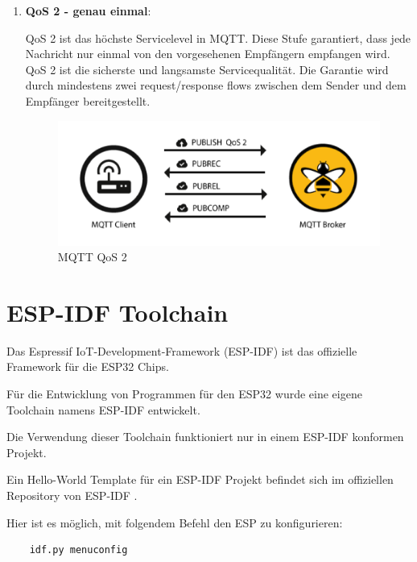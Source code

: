\begin{enumerate}
    \item \textbf{QoS 2 - genau einmal}:
    
    QoS 2 ist das höchste Servicelevel in MQTT. Diese Stufe garantiert, dass jede Nachricht nur einmal von den vorgesehenen Empfängern empfangen wird. QoS 2 ist die sicherste und langsamste Servicequalität. Die Garantie wird durch mindestens zwei request/response flows zwischen dem Sender und dem Empfänger bereitgestellt. 

    \begin{figure}[H]
        \begin{center}
            \includegraphics[scale=0.8]{images/QoS-2.png}
            \caption{MQTT QoS 2 \cite{hivemq}}
        \end{center}
    \end{figure}
\end{enumerate}

\section{ESP-IDF Toolchain}\label{sec:esp-idf-toolchain}

Das Espressif IoT-Development-Framework (ESP-IDF) ist das offizielle Framework für die ESP32 Chips. \cite{esp-idf-github}

Für die Entwicklung von Programmen für den ESP32 wurde eine eigene Toolchain namens ESP-IDF entwickelt.

Die Verwendung dieser Toolchain funktioniert nur in einem ESP-IDF konformen Projekt.

Ein Hello-World Template für ein ESP-IDF Projekt befindet sich im offiziellen Repository von ESP-IDF \cite{esp-idf-github-template}.

Hier ist es möglich, mit folgendem Befehl den ESP zu konfigurieren:

\begin{verbatim}
    idf.py menuconfig
\end{verbatim}

